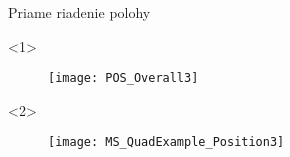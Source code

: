 \begin{frame}{Priame riadenie polohy}

  \begin{onlyenv}<1>
  \begin{figure}
\centering
  \texttt{[image: POS\_Overall3]}\\
\end{figure}
\end{onlyenv}


  \begin{onlyenv}<2>
  \begin{figure}
\centering
  \texttt{[image: MS\_QuadExample\_Position3]}\\
\end{figure}
\end{onlyenv}
\end{frame}





